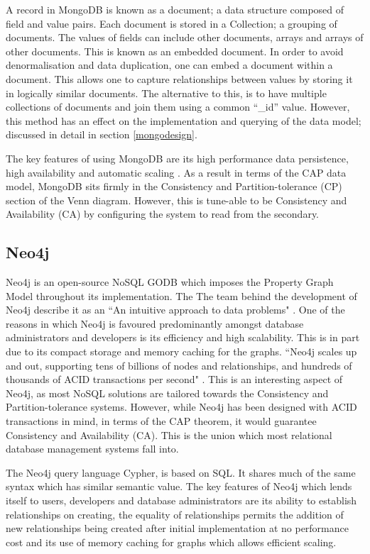A record in MongoDB is known as a document; a data structure composed of field and value pairs. Each document is stored in a Collection; a grouping of documents. The values of fields can include other documents, arrays and arrays of other documents. This is known as an embedded document. In order to avoid denormalisation and data duplication, one can embed a document within a document. This allows one to capture relationships between values by storing it in logically similar documents. The alternative to this, is to have multiple collections of documents and join them using a common ``\_id'' value. However, this method has an effect on the implementation and querying of the data model; discussed in detail in section \ref{mongodesign}.

The key features of using MongoDB are its high performance data persistence, high availability and automatic scaling \cite{md}. As a result in terms of the CAP data model, MongoDB sits firmly in the Consistency and Partition-tolerance (CP) section of the Venn diagram. However, this is tune-able to be Consistency and Availability (CA) by configuring the system to read from the secondary.

\subsection{Neo4j}\label{neo}
Neo4j is an open-source NoSQL GODB which imposes the Property Graph Model throughout its implementation. The The team behind the development of Neo4j describe it as an ``An intuitive approach to data problems" \cite{ndweb}. One of the reasons in which Neo4j is favoured predominantly amongst database administrators and developers is its efficiency and high scalability. This is in part due to its compact storage and memory caching for the graphs. ``Neo4j scales up and out, supporting tens of billions of nodes and relationships, and hundreds of thousands of ACID transactions per second" \cite{ndweb}. This is an interesting aspect of Neo4j, as most NoSQL solutions are tailored towards the Consistency and Partition-tolerance systems. However, while Neo4j has been designed with ACID transactions in mind, in terms of the CAP theorem, it would guarantee Consistency and Availability (CA). This is the union which most relational database management systems fall into.

The Neo4j query language Cypher, is based on SQL. It shares much of the same syntax which has similar semantic value. The key features of Neo4j which lends itself to users, developers and database administrators are its ability to establish relationships on creating, the equality of relationships permits the addition of new relationships being created after initial implementation at no performance cost and its use of memory caching for graphs which allows efficient scaling.

